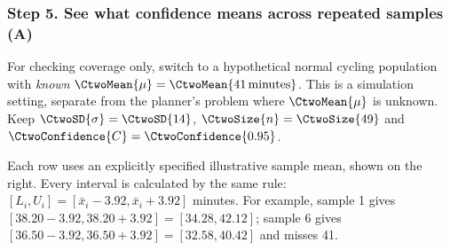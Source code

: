 \clearpage
\subsubsection*{Step 5. See what confidence means across repeated samples (A)}
For checking coverage only, switch to a hypothetical normal cycling population
with \emph{known} $\CtwoMean{\mu}=\CtwoMean{41\,\text{minutes}}$.
This is a simulation setting, separate from the planner's problem where
$\CtwoMean{\mu}$ is unknown. Keep $\CtwoSD{\sigma}=\CtwoSD{14}$,
$\CtwoSize{n}=\CtwoSize{49}$ and $\CtwoConfidence{C}=\CtwoConfidence{0.95}$.

Each row uses an explicitly specified illustrative sample mean, shown on the right.
Every interval is calculated by the same rule:
$[L_i,U_i]=[\bar{x}_i-3.92,\bar{x}_i+3.92]$ minutes.
For example, sample 1 gives $[38.20-3.92,38.20+3.92]=[34.28,42.12]$;
sample 6 gives $[36.50-3.92,36.50+3.92]=[32.58,40.42]$ and misses 41.

